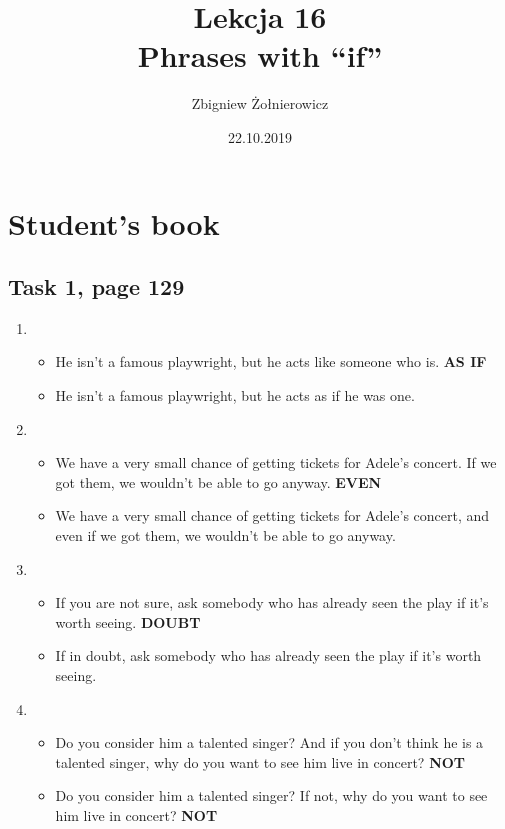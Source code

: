 \documentclass[a4paper]{article}
\begin{document}
\title{{\huge Lekcja 16} \\
{\large Phrases with ``if''}}
\author{Zbigniew Żołnierowicz}
\date{22.10.2019}
\maketitle
\section{Student's book}
\subsection{Task 1, page 129}
\begin{enumerate}
    \item \begin{itemize}
        \item He isn't a famous playwright, but he acts like someone who is. {\bf AS IF}
        \item He isn't a famous playwright, but he acts as if he was one.
    \end{itemize}
    \item \begin{itemize}
        \item We have a very small chance of getting tickets for Adele's concert. If we got them, we wouldn't be able to go anyway. {\bf EVEN}
        \item We have a very small chance of getting tickets for Adele's concert, and even if we got them, we wouldn't be able to go anyway.
    \end{itemize}
    \item \begin{itemize}
        \item If you are not sure, ask somebody who has already seen the play if it's worth seeing. {\bf DOUBT}
        \item If in doubt, ask somebody who has already seen the play if it's worth seeing.
    \end{itemize}
    \item \begin{itemize}
        \item Do you consider him a talented singer? And if you don't think he is a talented singer, why do you want to see him live in concert? {\bf NOT}
        \item Do you consider him a talented singer? If not, why do you want to see him live in concert? {\bf NOT}
    \end{itemize}

\end{enumerate}
\end{document}
